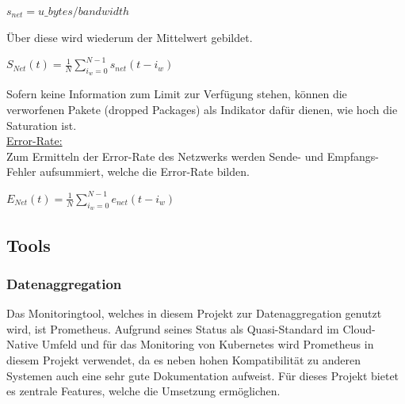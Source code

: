 \documentclass[a4paper,10pt]{scrartcl}
\begin{document}
\begin{description}
\begin{minipage}{\linewidth}
\(
\displaystyle{s_{net}=u\_bytes/bandwidth}
\) 
\end{minipage}

Über diese wird wiederum der Mittelwert gebildet.

\begin{minipage}{\linewidth}
\(
\displaystyle{S_{Net}(t)=\frac{1}{N}{\sum\limits_{i_{w}=0}^{N-1} s_{net}{(t-i_{w})}} }
\) 
\end{minipage}

Sofern keine Information zum Limit zur Verfügung stehen, können die verworfenen Pakete (dropped Packages) als Indikator dafür dienen, wie hoch die Saturation ist.\\

\underline{Error-Rate:}\\
Zum Ermitteln der Error-Rate des Netzwerks werden Sende- und Empfangs-Fehler aufsummiert, welche die Error-Rate bilden.

\begin{minipage}{\linewidth}
\(
\displaystyle{E_{Net}(t)=\frac{1}{N}{\sum\limits_{i_{w}=0}^{N-1} e_{net}{(t-i_{w})}} }
\) 
\end{minipage}

\end{description}
\subsection{Tools}
\subsubsection{Datenaggregation}

Das Monitoringtool, welches in diesem Projekt zur Datenaggregation genutzt wird, ist Prometheus. Aufgrund seines Status als Quasi-Standard im Cloud-Native Umfeld und für das Monitoring von Kubernetes wird Prometheus in diesem Projekt verwendet, da es neben hohen Kompatibilität zu anderen Systemen auch eine sehr gute Dokumentation aufweist. Für dieses Projekt bietet es zentrale Features, welche die Umsetzung ermöglichen.
\end{document}
